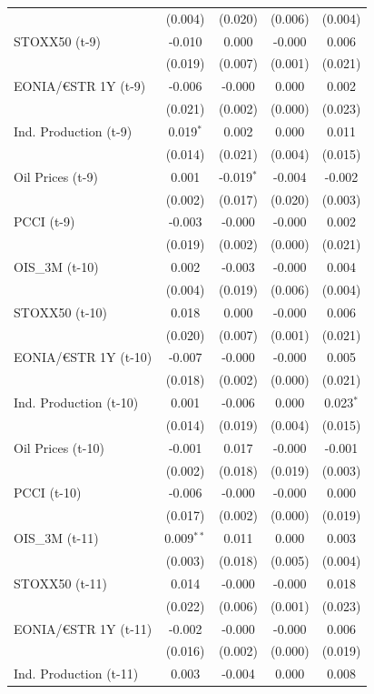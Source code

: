 \begin{longtable}[t]{lcccc}
 & (0.004) & (0.020) & (0.006) & (0.004)\\
STOXX50 (t-9) & -0.010 & 0.000 & -0.000 & 0.006\\
 & (0.019) & (0.007) & (0.001) & (0.021)\\
EONIA/€STR 1Y (t-9) & -0.006 & -0.000 & 0.000 & 0.002\\
 & (0.021) & (0.002) & (0.000) & (0.023)\\
Ind. Production (t-9) & 0.019$^{*}$ & 0.002 & 0.000 & 0.011\\
 & (0.014) & (0.021) & (0.004) & (0.015)\\
Oil Prices (t-9) & 0.001 & -0.019$^{*}$ & -0.004 & -0.002\\
 & (0.002) & (0.017) & (0.020) & (0.003)\\
PCCI (t-9) & -0.003 & -0.000 & -0.000 & 0.002\\
 & (0.019) & (0.002) & (0.000) & (0.021)\\
OIS\_3M (t-10) & 0.002 & -0.003 & -0.000 & 0.004\\
 & (0.004) & (0.019) & (0.006) & (0.004)\\
STOXX50 (t-10) & 0.018 & 0.000 & -0.000 & 0.006\\
 & (0.020) & (0.007) & (0.001) & (0.021)\\
EONIA/€STR 1Y (t-10) & -0.007 & -0.000 & -0.000 & 0.005\\
 & (0.018) & (0.002) & (0.000) & (0.021)\\
Ind. Production (t-10) & 0.001 & -0.006 & 0.000 & 0.023$^{*}$\\
 & (0.014) & (0.019) & (0.004) & (0.015)\\
Oil Prices (t-10) & -0.001 & 0.017 & -0.000 & -0.001\\
 & (0.002) & (0.018) & (0.019) & (0.003)\\
PCCI (t-10) & -0.006 & -0.000 & -0.000 & 0.000\\
 & (0.017) & (0.002) & (0.000) & (0.019)\\
OIS\_3M (t-11) & 0.009$^{**}$ & 0.011 & 0.000 & 0.003\\
 & (0.003) & (0.018) & (0.005) & (0.004)\\
STOXX50 (t-11) & 0.014 & -0.000 & -0.000 & 0.018\\
 & (0.022) & (0.006) & (0.001) & (0.023)\\
EONIA/€STR 1Y (t-11) & -0.002 & -0.000 & -0.000 & 0.006\\
 & (0.016) & (0.002) & (0.000) & (0.019)\\
Ind. Production (t-11) & 0.003 & -0.004 & 0.000 & 0.008\\

\end{longtable}
